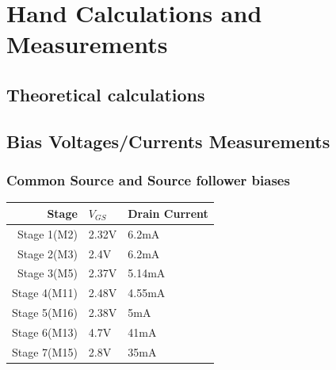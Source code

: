 \documentclass[11pt, twoside, letterpaper]{article}
\begin{document}
\section{Hand Calculations and Measurements}

\subsection{Theoretical calculations}


\subsection{Bias Voltages/Currents Measurements}
\subsubsection{Common Source and Source follower biases}
\begin{tabular}{|r|l|l|}
\hline
Stage & $V_{GS}$ & Drain Current\\
\hline
Stage 1(M2) &2.32V&6.2mA\\
Stage 2(M3) &2.4V&6.2mA\\
Stage 3(M5) &2.37V&5.14mA\\
Stage 4(M11) &2.48V&4.55mA\\
Stage 5(M16) &2.38V&5mA\\%
Stage 6(M13) &4.7V&41mA\\
Stage 7(M15) &2.8V&35mA\\
\hline
\end{tabular}
\FloatBarrier
\end{document}
